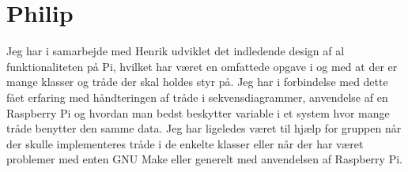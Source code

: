 \section{Philip}

Jeg har i samarbejde med Henrik udviklet det indledende design af al funktionaliteten på Pi, hvilket har været en omfattede opgave i og med at der er mange klasser og tråde der skal holdes styr på. Jeg har i forbindelse med dette fået erfaring med håndteringen af tråde i sekvensdiagrammer, anvendelse af en Raspberry Pi og hvordan man bedst beskytter variable i et system hvor mange tråde benytter den samme data. Jeg har ligeledes været til hjælp for gruppen når der skulle implementeres tråde i de enkelte klasser eller når der har været problemer med enten GNU Make eller generelt med anvendelsen af Raspberry Pi.